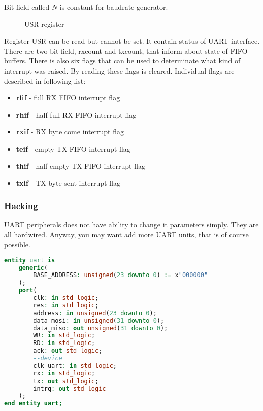 Bit field called $N$ is constant for baudrate generator.

\begin{figure}[H]
    \centering
    \caption{USR register}
    \label{fig:USR_reg}
\end{figure}

Register USR can be read but cannot be set. It contain status of UART interface.
There are two bit field, rxcount and txcount, that inform about state of FIFO buffers.
There is also six flags that can be used to determinate what kind of interrupt
was raised. By reading these flags is cleared. Individual flags are described in
following list:

\begin{itemize}
    \item \textbf{rfif} - full RX FIFO interrupt flag
    \item \textbf{rhif} - half full RX FIFO interrupt flag
    \item \textbf{rxif} - RX byte come interrupt flag
    \item \textbf{teif} - empty TX FIFO interrupt flag
    \item \textbf{thif} - half empty TX FIFO interrupt flag
    \item \textbf{txif} - TX byte sent interrupt flag
\end{itemize}

\subsubsection{Hacking}

UART peripherals does not have ability to change it parameters simply. They are
all hardwired. Anyway, you may want add more UART units, that is of course
possible.

\begin{lstlisting}[language=VHDL, frame=single]
entity uart is
    generic(
        BASE_ADDRESS: unsigned(23 downto 0) := x"000000"
    );
    port(
        clk: in std_logic;
        res: in std_logic;
        address: in unsigned(23 downto 0);
        data_mosi: in unsigned(31 downto 0);
        data_miso: out unsigned(31 downto 0);
        WR: in std_logic;
        RD: in std_logic;
        ack: out std_logic;
        --device
        clk_uart: in std_logic;
        rx: in std_logic;
        tx: out std_logic;
        intrq: out std_logic
    );
end entity uart;
\end{lstlisting}

